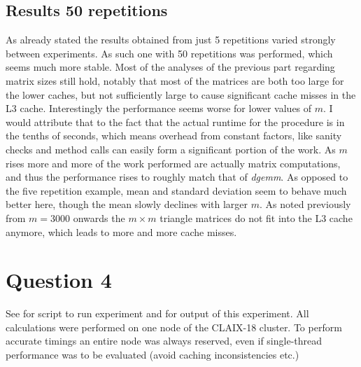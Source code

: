 \documentclass{scrartcl}
\begin{document}
	\subsection{Results 50 repetitions}
	As already stated the results obtained from just 5 repetitions varied strongly between experiments.
	As such one with 50 repetitions was performed, which seems much more stable.
	Most of the analyses of the previous part regarding matrix sizes still hold, notably that most of the matrices are both too large for the lower caches, but not sufficiently large to cause significant cache misses in the L3 cache.
	Interestingly the performance seems worse for lower values of $m$. 
	I would attribute that to the fact that the actual runtime for the procedure is in the tenths of seconds, which means overhead from constant factors, like sanity checks and method calls can easily form a significant portion of the work.
	As $m$ rises more and more of the work performed are actually matrix computations, and thus the performance rises to roughly match that of \emph{dgemm}.
	As opposed to the five repetition example, mean and standard deviation seem to behave much better here, though the mean slowly declines with larger $m$.
	As noted previously from $m=3000$ onwards the $m\times m$ triangle matrices do not fit into the L3 cache anymore, which leads to more and more cache misses.
	
	\section{Question 4}
	See  for script to run experiment and  for output of this experiment.
	All calculations were performed on one node of the CLAIX-18 cluster.
	To perform accurate timings an entire node was always reserved, even if single-thread performance was to be evaluated (avoid caching inconsistencies etc.)
	
\end{document}
